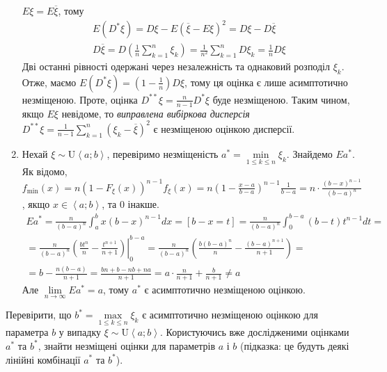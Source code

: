 \begin{example}
\begin{enumerate}
        $E\xi = E\overline{\xi}$, тому
        \begin{gather*}
            E\left( D^* \xi\right) = D\xi - E\left(\overline{\xi} - E\xi\right)^2= D\xi - D\overline{\xi} \\
            D\overline{\xi} = D\left(\frac{1}{n}\sum\limits_{k=1}^n \xi_k \right) = \frac{1}{n^2} \sum\limits_{k=1}^n D\xi_k = \frac{1}{n} D\xi
        \end{gather*}
        Дві останні рівності одержані через незалежність та однаковий розподіл $\xi_k$. Отже, маємо $E\left( D^* \xi\right) = \left( 1- \frac{1}{n}\right) D\xi$,
        тому ця оцінка є лише асимптотично незміщеною. Проте, оцінка $D^{**}\xi = \frac{n}{n-1} D^*\xi$ буде незміщеною.
        Таким чином, якщо $E\xi$ невідоме, то \emph{виправлена вибіркова дисперсія} 
        $D^{**}\xi = \frac{1}{n-1} \sum\limits_{k=1}^n \left(\xi_k - \overline{\xi} \right)^2$ є незміщеною оцінкою дисперсії.
        \item Нехай $\xi \sim \mathrm{U}\left< a; b\right>$, перевіримо незміщеність $a^* = \underset{1\leq k \leq n}{\min}\xi_k$.
        Знайдемо $Ea^*$. Як відомо, 
        $f_{\min}(x) = n \left(1-F_{\xi}(x)\right)^{n-1} f_{\xi}(x) = n\left( 1- \frac{x-a}{b-a}\right)^{n-1}\frac{1}{b-a} = n\cdot\frac{(b-x)^{n-1}}{(b-a)^n}$, якщо
        $x \in \left< a; b\right>$, та $0$ інакше.
        \begin{gather*}
            Ea^* = \frac{n}{(b-a)^n} \int_a^b x(b-x)^{n-1} dx = \left[ b-x = t \right] = 
            \frac{n}{(b-a)^n} \int_0^{b-a} (b-t)t^{n-1} dt = \\
            = \frac{n}{(b-a)^n} \left.\left( \frac{bt^n}{n} - \frac{t^{n+1}}{n+1}\right)\right|_0^{b-a} = 
            \frac{n}{(b-a)^n} \left(\frac{b(b-a)^n}{n} - \frac{(b-a)^{n+1}}{n+1}\right) = \\
            = b - \frac{n(b-a)}{n+1} = \frac{bn + b - nb + na}{n+1} = a \cdot \frac{n}{n+1} + \frac{b}{n+1} \neq a
         \end{gather*}
         Але $\underset{n\to\infty}{\lim} Ea^* = a$, тому $a^*$ є асимптотично незміщеною оцінкою.
    \end{enumerate}
 \end{example}
 \begin{exercise}
     Перевірити, що $b^* = \underset{1\leq k \leq n}{\max}\xi_k$ є асимптотично незміщеною оцінкою для параметра $b$ у випадку $\xi \sim \mathrm{U}\left< a; b\right>$.
     Користуючись вже дослідженими оцінками $a^*$ та $b^*$, знайти незміщені оцінки для параметрів $a$ і $b$ (підказка: це будуть деякі лінійні комбінації $a^*$ та $b^*$).
 \end{exercise}